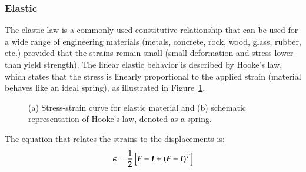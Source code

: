 \subsubsection{Elastic}
The elastic law is a commonly used constitutive relationship that can be used for a wide range of engineering materials (\eg metals, concrete, rock, wood, glass, rubber, etc.) provided that the strains remain small (\ie small deformation and stress lower than yield strength). The linear elastic behavior is described by Hooke's law, which states that the stress is linearly proportional to the applied strain (material behaves like an ideal spring), as illustrated in Figure~\ref{fig:smm:cl:elastic}.
\begin{figure}[!htb]
  \begin{center}

    \hspace{0.05\textwidth}
    \caption{(a) Stress-strain curve for elastic material and (b) schematic representation of Hooke's law, denoted as a spring.}
    \label{fig:smm:cl:elastic}
  \end{center}
\end{figure}
The equation that relates the strains to the displacements is:
\begin{equation}\label{eqn:smm:strain_inf}
  \boldsymbol{\epsilon} = \frac{1}{2} \left[ \boldsymbol{F}-\boldsymbol{I}+(\boldsymbol{F}-\boldsymbol{I})^T \right]
\end{equation}
